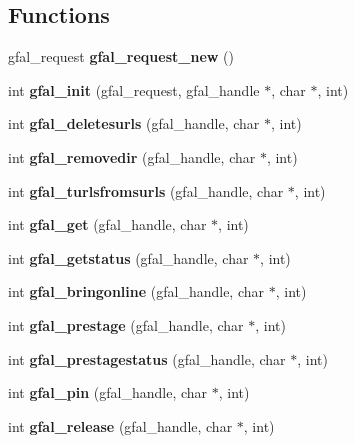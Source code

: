 \subsection*{Functions}
\begin{CompactItemize}
\item 
gfal\_\-request \textbf{gfal\_\-request\_\-new} ()\label{gfal__common_8h_b5d503849656335232e56583b376ee22}

\item 
int \textbf{gfal\_\-init} (gfal\_\-request, gfal\_\-handle $\ast$, char $\ast$, int)\label{gfal__common_8h_6a6a376acadfe02f8b8fdd07d0d19dd1}

\item 
int \textbf{gfal\_\-deletesurls} (gfal\_\-handle, char $\ast$, int)\label{gfal__common_8h_5e5a84f63eaa3bf2bb079e9f2eb26206}

\item 
int \textbf{gfal\_\-removedir} (gfal\_\-handle, char $\ast$, int)\label{gfal__common_8h_0a50e7e9c9f23b0f3272d104ae69daee}

\item 
int \textbf{gfal\_\-turlsfromsurls} (gfal\_\-handle, char $\ast$, int)\label{gfal__common_8h_d7035b9b9e3f0c9938c3a2a45cfa30b9}

\item 
int \textbf{gfal\_\-get} (gfal\_\-handle, char $\ast$, int)\label{gfal__common_8h_5a11900a104a51b955944379c7397db1}

\item 
int \textbf{gfal\_\-getstatus} (gfal\_\-handle, char $\ast$, int)\label{gfal__common_8h_8fe0e87610c1221796a3d10d2cf4816e}

\item 
int \textbf{gfal\_\-bringonline} (gfal\_\-handle, char $\ast$, int)\label{gfal__common_8h_4eb3771f917c71fee4cc06d925a19322}

\item 
int \textbf{gfal\_\-prestage} (gfal\_\-handle, char $\ast$, int)\label{gfal__common_8h_17c188741a1d8f6db0cfbe22ef2c402f}

\item 
int \textbf{gfal\_\-prestagestatus} (gfal\_\-handle, char $\ast$, int)\label{gfal__common_8h_ae17e3249e7ab47bfcbb4bbfb0e6da6c}

\item 
int \textbf{gfal\_\-pin} (gfal\_\-handle, char $\ast$, int)\label{gfal__common_8h_9764581af9643f6d3f014b2bc9d5c4ac}

\item 
int \textbf{gfal\_\-release} (gfal\_\-handle, char $\ast$, int)\label{gfal__common_8h_d67e1b55d16fbcc9c02e0ab44bbed7bd}


\end{CompactItemize}
